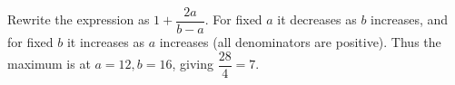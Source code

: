 Rewrite the expression as $1+\dfrac{2a}{b-a}$. For fixed $a$ it decreases as $b$ increases, and for fixed $b$ it increases as $a$ increases (all denominators are positive). Thus the maximum is at $a=12,b=16$, giving $\dfrac{28}{4}=\boxed7$.
